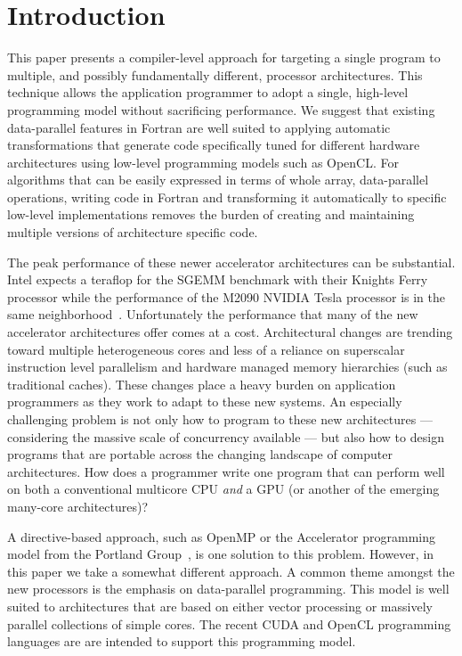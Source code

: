 \section{Introduction}
\label{sec:intro}

This paper presents a compiler-level approach for targeting a single program to
multiple, and possibly fundamentally different, processor architectures.  This
technique allows the application programmer to adopt a single, high-level
programming model without sacrificing performance.  We suggest that existing
data-parallel features in Fortran are well suited to applying automatic
transformations that generate code specifically tuned for different hardware
architectures using low-level programming models such as OpenCL.  For algorithms
that can be easily expressed in terms of whole array, data-parallel operations,
writing code in Fortran and transforming it automatically to specific low-level
implementations removes the burden of creating and maintaining multiple versions
of architecture specific code.

The peak performance of these newer accelerator architectures can be substantial.
Intel expects a teraflop for the SGEMM benchmark with their Knights Ferry
processor while the performance of the M2090 NVIDIA Tesla processor is in the
same neighborhood~\cite{hpcwire11manycore}.  Unfortunately the performance that
many of the new accelerator architectures offer comes at a cost.  Architectural
changes are trending toward multiple heterogeneous cores and less of a reliance
on superscalar instruction level parallelism and hardware managed memory
hierarchies (such as traditional caches).  These changes place a heavy burden on
application programmers as they work to adapt to these new systems.  An
especially challenging problem is not only how to program to these new
architectures --- considering the massive scale of concurrency available --- but
also how to design programs that are portable across the changing landscape of
computer architectures.  How does a programmer write one program that can
perform well on both a conventional multicore CPU \emph{and} a GPU (or another
of the emerging many-core architectures)?

A directive-based approach, such as OpenMP or the Accelerator programming model
from the Portland Group~\cite{pgi10accelerator}, is one solution to this
problem.  However, in this paper we take a somewhat different approach.  A
common theme amongst the new processors is the emphasis on data-parallel
programming.  This model is well suited to architectures that are
based on either vector processing or massively parallel collections of simple
cores.  The recent CUDA and OpenCL programming languages are are intended to
support this programming model.

